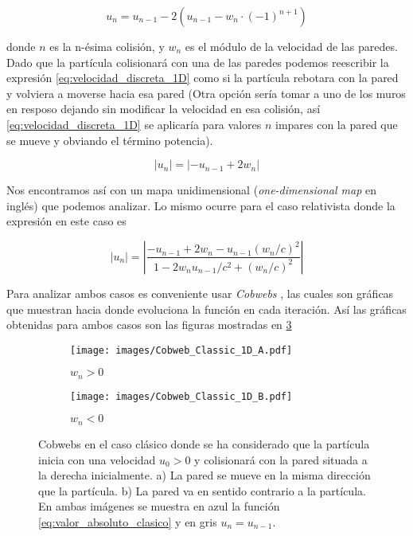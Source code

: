 \begin{equation}\label{eq:velocidad_discreta_1D}
    u_n = u_{n-1} - 2\left( u_{n-1} - w_n \cdot (-1)^{n+1} \right)
\end{equation}

donde \( n \) es la n-ésima colisión, y \( w_n \) es el módulo de la velocidad de las paredes. Dado que la partícula colisionará con una de las paredes podemos reescribir la expresión \ref{eq:velocidad_discreta_1D} como si la partícula rebotara con la pared y volviera a moverse hacia esa pared (Otra opción sería tomar a uno de los muros en resposo dejando sin modificar la velocidad en esa colisión, así \ref{eq:velocidad_discreta_1D} se aplicaría para valores \( n \) impares con la pared que se mueve y obviando el término potencia). 

\begin{equation}\label{eq:valor_absoluto_clasico}
    \left| u_n \right| =\left| -u_{n-1} + 2w_n \right|
\end{equation}

Nos encontramos así con un mapa unidimensional (\textit{one-dimensional map} en inglés) que podemos analizar. Lo mismo ocurre para el caso relativista donde la expresión en este caso es

\begin{equation}\label{eq:valor_absoluto_relativista}
    \left| u_n \right| = \left|  \dfrac{-u_{n-1} + 2w_n - u_{n-1}(w_n/c)^2}{1 - 2w_n u_{n-1}/c^2 + (w_n/c)^2} \right|
\end{equation}

Para analizar ambos casos es conveniente usar \textit{Cobwebs} \cite{Strogatz} , las cuales son gráficas que muestran hacia donde evoluciona la función en cada iteración. Así las gráficas obtenidas para ambos casos son las figuras mostradas en \ref{fig:Cobweb_Classic_1D}

\begin{figure}[H]
    \centering
    \begin{subfigure}[b]{0.49\textwidth}
        \centering
        \texttt{[image: images/Cobweb\_Classic\_1D\_A.pdf]}
        \caption{$w_n>0$}
        \label{fig:Cobweb_Classic_1D_A}
    \end{subfigure}
    \hfill
    \begin{subfigure}[b]{0.49\textwidth}
        \centering
        \texttt{[image: images/Cobweb\_Classic\_1D\_B.pdf]}
        \caption{$w_n<0$}
        \label{fig:Cobweb_Classic_1D_B}
    \end{subfigure}
    \caption{Cobwebs en el caso clásico donde se ha considerado que la partícula inicia con una velocidad $u_0 > 0$ y colisionará con la pared situada a la derecha inicialmente. a) La pared se mueve en la misma dirección que la partícula. b) La pared va en sentido contrario a la partícula. En ambas imágenes se muestra en azul la función \ref{eq:valor_absoluto_clasico} y en gris \( u_n = u_{n-1} \).}
        \label{fig:Cobweb_Classic_1D}
\end{figure}


